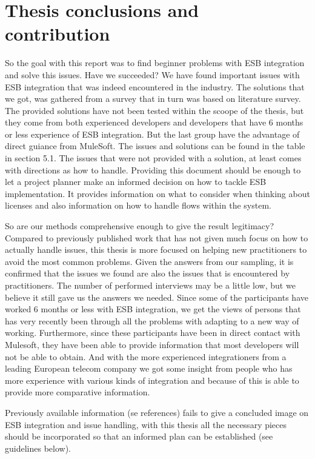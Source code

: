 \documentclass{llncs}
\begin{document}
\section{Thesis conclusions and contribution}
So the goal with this report was to find beginner problems with ESB integration and solve this issues. Have we succeeded? We have found important issues with ESB integration that was indeed encountered in the industry. The solutions that we got, was gathered from a survey that in turn was based on literature survey. The provided solutions have not been tested within the scoope of the thesis, but they come from both experienced developers and developers that have 6 months or less experience of ESB integration. But the last group have the advantage of direct guiance from MuleSoft.
The issues and solutions can be found in the table in section 5.1.
The issues that were not provided with a solution, at least comes with directions as how to handle. Providing this document should be enough to let a project planner make an informed decision on how to tackle ESB implementation. It provides information on what to consider when thinking about licenses and also information on how to handle flows within the system.

So are our methods comprehensive enough to give the result legitimacy? Compared to previously published work that has not given much focus on how to actually handle issues, this thesis is more focused on helping new practitioners to avoid the most common problems.
Given the answers from our sampling, it is confirmed that the issues we found are also the issues that is encountered by practitioners.
The number of performed interviews may be a little low, but we believe it still gave us the answers we needed. Since some of the participants have worked 6 months or less with ESB integration, we get the views of persons that has very recently been through all the problems with adapting to a new way of working. Furthermore, since these participants have been in direct contact with Mulesoft, they have been able to provide information that most developers will not be able to obtain. And with the more experienced integrationers from a leading European telecom company we got some insight from people who has more experience with various kinds of integration and because of this is able to provide more comparative information.

Previously available information (se references) fails to give a concluded image on ESB integration and issue handling, with this thesis all the necessary pieces should be incorporated so that an informed plan can be established (see guidelines below).
\end{document}
